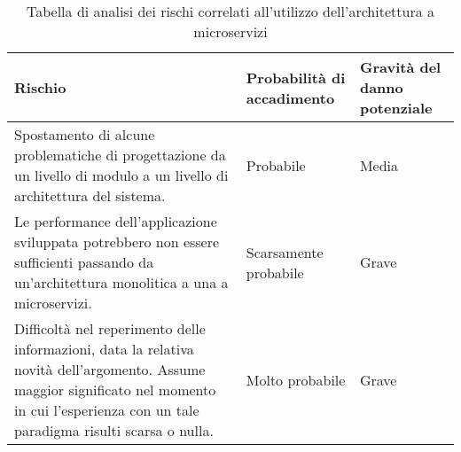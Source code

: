 \begin{table}
\caption{Tabella di analisi dei rischi correlati all'utilizzo dell'architettura a microservizi}
\label{tab:rischi-arch-microservizi}
\begin{tabularx}{\linewidth}{|p{7.5cm}|X|X|}
\hline
\textbf{Rischio} & \textbf{Probabilità di accadimento} & \textbf{Gravità del danno potenziale}\\
\hline
Spostamento di alcune problematiche di progettazione da un livello di modulo a un livello di architettura del sistema. & Probabile & Media \\
\hline
Le performance dell'applicazione sviluppata potrebbero non essere sufficienti passando da un'architettura monolitica a una a microservizi. & Scarsamente probabile & Grave \\
\hline
Difficoltà nel reperimento delle informazioni, data la relativa novità dell'argomento. Assume maggior significato nel momento in cui l'esperienza con un tale paradigma risulti scarsa o nulla. & Molto probabile & Grave \\
\hline
\end{tabularx}
\end{table}
